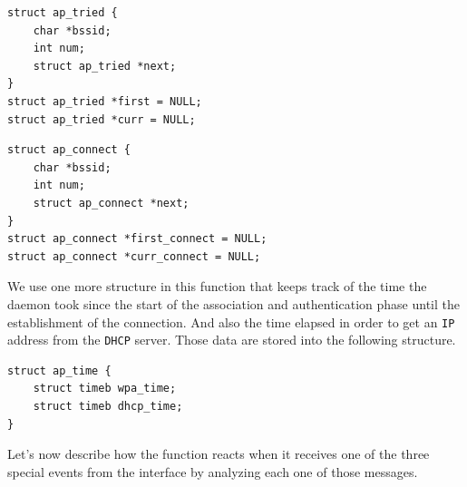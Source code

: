 \begin{lstlisting}[frame=single,breaklines=true,caption={Tried APs structure}]
struct ap_tried {
	char *bssid;
	int num;
	struct ap_tried *next;
}
struct ap_tried *first = NULL;
struct ap_tried *curr = NULL;
\end{lstlisting}

\begin{lstlisting}[frame=single,breaklines=true,caption={Connected APs structure}]
struct ap_connect {
	char *bssid;
	int num;
	struct ap_connect *next;
}
struct ap_connect *first_connect = NULL;
struct ap_connect *curr_connect = NULL;
\end{lstlisting}



We use one more structure in this function that keeps track of the time the daemon took since the start of the association and authentication phase until the establishment of the connection. And also the time elapsed in order to get an \texttt{IP} address from the \texttt{DHCP} server. Those data are stored into the following structure.\\

\begin{lstlisting}[frame=single,breaklines=true,caption={Elapsed time structure}]
struct ap_time {
	struct timeb wpa_time;
	struct timeb dhcp_time;
}
\end{lstlisting}

Let's now describe how the function reacts when it receives one of the three special events from the interface by analyzing each one of those messages.

